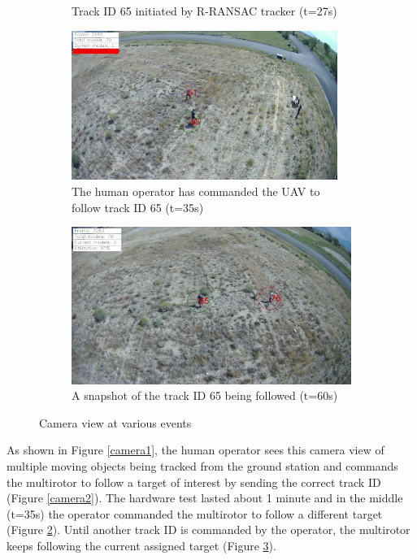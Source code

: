 \begin{figure}[htbp]
\begin{subfigure}{0.48\linewidth}
		\caption{Track ID 65 initiated by R-RANSAC tracker (t=27s)}
		\label{camera3}
	\end{subfigure}
	\begin{subfigure}{0.48\linewidth}
		\centering
		\includegraphics[width=0.95\textwidth]{images/chapter3/ID65_follow_begin.png}
		\caption{The human operator has commanded the UAV to follow track ID 65 (t=35s)}
		\label{camera4}
	\end{subfigure}
	\centering
	\begin{subfigure}{0.48\linewidth}
		\centering
		\includegraphics[width=\textwidth]{images/chapter3/ID65_following.png}
		\caption{A snapshot of the track ID 65 being followed (t=60s)}
		\label{camera5}
	\end{subfigure}
	\caption{Camera view at various events}
	\label{camera}
\end{figure}
As shown in Figure \ref{camera1}, the human operator sees this camera view of multiple moving objects being tracked from the ground station and commands the multirotor to follow a target of interest by sending the correct track ID (Figure \ref{camera2}). The hardware test lasted about 1 minute and in the middle (t=35s) the operator commanded the multirotor to follow a different target (Figure \ref{camera4}). Until another track ID is commanded by the operator, the multirotor keeps following the current assigned target (Figure \ref{camera5}).

